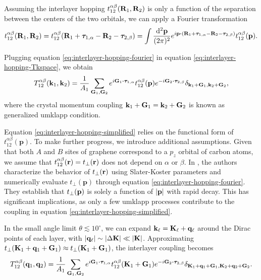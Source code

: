 \documentclass[12pt]{report}
\begin{document}
Assuming the interlayer hopping $t_{12}^{\alpha\beta}(\vb{R}_1,\vb{R}_2)$ is only a function of the separation between the centers of the two orbitals, we can apply a Fourier transformation
\begin{equation} \label{eq:interlayer-hopping-fourier}
t_{12}^{\alpha\beta}(\R_1,\R_2) = t_{12}^{\alpha\beta}(\R_1+\vtau_{1,\alpha}-\R_2-\vtau_{2,\beta}) =
\int \frac{\dd[2]{\p}}{(2\pi)^2} e^{i \p \vdot (\R_1+\vtau_{1,\alpha}-\R_2-\vtau_{2,\beta})} t_{12}^{\alpha\beta}(\p).
\end{equation}

Plugging equation \ref{eq:interlayer-hopping-fourier} in equation \ref{eq:interlayer-hopping-Tkspace}, we obtain
\begin{equation} \label{eq:interlayer-hopping-simplified}
T_{12}^{\alpha\beta}(\k_1,\k_2) = \frac{1}{A_1}
\sum_{\G_1, \G_2} e^{i\G_1\vdot\vtau_{1,\alpha}} t_{12}^{\alpha\beta}(\p)
e^{-i\G_2\vdot\vtau_{2,\beta}} \delta_{\k_1+\G_1, \k_2+\G_2},
\end{equation}
where the crystal momentum coupling ${\vb{k}}_1 + {\vb{G}}_1 = {\vb{k}}_2 + {\vb{G}}_2$ is known as generalized umklapp condition.

\n

Equation \ref{eq:interlayer-hopping-simplified} relies on the functional form of $t_{12}^{\alpha\beta}(\mathbf{p})$. To make further progress, we introduce additional assumptions. Given that both $A$ and $B$ sites of graphene correspond to a $p_z$ orbital of carbon atoms, we assume that $t_{12}^{\alpha\beta}({\vb{r}}) = t_\perp({\vb{r}})$ does not depend on $\alpha$ or $\beta$. In \cite{tperp-laissardiere2012}, the authors characterize the behavior of $t_\perp({\vb{r}})$ using Slater-Koster parameters and numerically evaluate $t_\perp(\mathbf{p})$ through equation \ref{eq:interlayer-hopping-fourier}. They establish that $t_\perp({\vb{p}})$ is solely a function of $\abs{{\vb{p}}}$ with rapid decay. This has significant implications, as only a few umklapp processes contribute to the coupling in equation \ref{eq:interlayer-hopping-simplified}.

\n

In the small angle limit $\theta \lesssim 10^\circ$, we can expand ${\vb{k}}_\ell = \vb{K}_\ell + {\vb{q}}_\ell$ around the Dirac points of each layer, with $\abs{{\vb{q}}_\ell} \sim \abs{\Delta \vb{K}} \ll \abs{\vb{K}}$. Approximating $t_\perp(\vb{K}_1+{\vb{q}}_1+{\vb{G}}_1) \approx t_\perp(\vb{K}_1+{\vb{G}}_1)$, the interlayer coupling becomes
\begin{equation} \label{eq:interlayer-hopping-truncation}
T_{12}^{\alpha\beta}(\q_1,\q_2) = \frac{1}{A_{1}} \sum_{\G_1,\G_2} e^{i\G_1\vdot\vtau_{1,\alpha}}
t_{12}^{\alpha\beta}(\K_1+\G_1) e^{-i\G_2\vdot\vtau_{2,\beta}}
\delta_{\K_1+\q_1+\G_1,\K_2+\q_2+\G_2}.
\end{equation}
\end{document}
